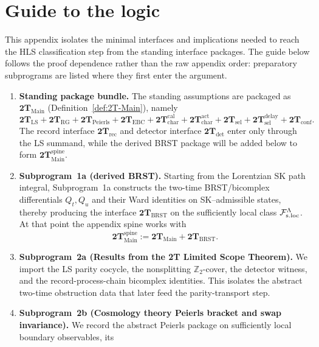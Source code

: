 
\section{Guide to the logic}
\label{sec:appendix-guide}
This appendix isolates the minimal interfaces and implications needed to reach the
HLS classification step from the standing interface packages.  The guide below
follows the proof dependence rather than the raw appendix order: preparatory
subprograms are listed where they first enter the argument.
\begin{enumerate}[label=\textnormal{(\roman*)},leftmargin=*,itemsep=0.4em]
\item \textbf{Standing package bundle.} The standing assumptions are packaged as
  \(\mathbf{2T}_{\mathrm{Main}}\)
  \textnormal{(Definition~\ref{def:2T-Main})}, namely
  \[
  \mathbf{2T}_{\mathrm{LS}}
  + \mathbf{2T}_{\mathrm{RG}}
  + \mathbf{2T}_{\mathrm{Peierls}}
  + \mathbf{2T}_{\mathrm{EBC}}
  + \mathbf{2T}_{\mathrm{char}}^{\mathrm{cal}}
  + \mathbf{2T}_{\mathrm{char}}^{\mathrm{act}}
  + \mathbf{2T}_{\mathrm{sel}}
  + \mathbf{2T}_{\mathrm{sel}}^{\mathrm{delay}}
  + \mathbf{2T}_{\mathrm{conf}}.
  \]
  The record interface \(\mathbf{2T}_{\mathrm{rec}}\) and detector interface
  \(\mathbf{2T}_{\mathrm{det}}\) enter only through the LS summand, while the
  derived BRST package will be added below to form
  \(\mathbf{2T}_{\mathrm{Main}}^{\mathrm{spine}}\).
\item \textbf{Subprogram~1a (derived BRST).} Starting from the Lorentzian SK path
  integral, Subprogram~1a constructs the two-time BRST/bicomplex differentials
  \(Q_t,Q_u\) and their Ward identities on SK--admissible states, thereby
  producing the interface \(\mathbf{2T}_{\mathrm{BRST}}\) on the sufficiently
  local class \(\mathcal F_{\mathrm{s.loc}}^\Lambda\).  At that point the appendix spine works with
  \[
  \mathbf{2T}_{\mathrm{Main}}^{\mathrm{spine}}
  :=
  \mathbf{2T}_{\mathrm{Main}}+\mathbf{2T}_{\mathrm{BRST}}.
  \]
\item \textbf{Subprogram~2a (Results from the 2T Limited Scope Theorem).}  We import the LS
  parity cocycle, the nonsplitting \(\mathbb Z_2\)-cover, the detector witness,
  and the record-process-chain bicomplex identities.  This isolates the
  abstract two-time obstruction data that later feed the parity-transport step.
\item \textbf{Subprogram~2b (Cosmology theory Peierls bracket and swap invariance).}  We record
  the abstract Peierls package on sufficiently local boundary observables, its

\end{enumerate}
